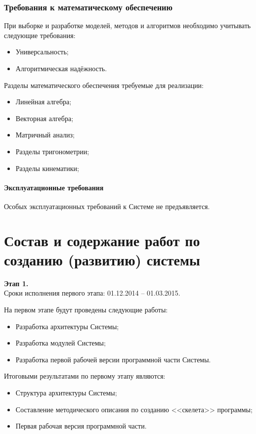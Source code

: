 \subsection{Требования к математическому обеспечению}
При выборке и разработке моделей, методов и алгоритмов необходимо учитывать следующие требования:
\begin{itemize}
    \item Универсальность;
    \item Алгоритмическая надёжность.
\end{itemize}

Разделы математического обеспечения требуемые для реализации:
\begin{itemize}
    \item Линейная алгебра;
    \item Векторная алгебра;
    \item Матричный анализ;
    \item Разделы тригонометрии;
    \item Разделы кинематики;
\end{itemize} 

\subsubsection{Эксплуатационные требования}
Особых эксплуатационных требований к Системе не предъявляется.

\chapter{Состав и содержание работ по созданию (развитию) системы}
\textbf{Этап 1.}\\
Сроки исполнения первого этапа: 01.12.2014 -- 01.03.2015.

На первом этапе будут проведены следующие работы:
\begin{itemize}
    \item Разработка архитектуры Системы;
    \item Разработка модулей Системы;
    \item Разработка первой рабочей версии программной части Системы.
\end{itemize}
Итоговыми результатами по первому этапу являются:
\begin{itemize}
    \item Структура архитектуры Системы;
    \item Составление методического описания по созданию <<скелета>> программы;
    \item Первая рабочая версия программной части.
\end{itemize}

